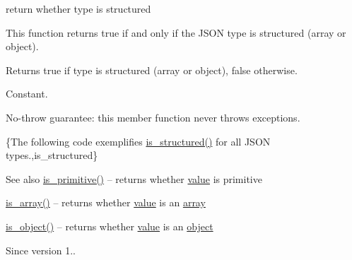 return whether type is structured 

This function returns true if and only if the J\+S\+ON type is structured (array or object).

\begin{DoxyReturn}{Returns}
{\ttfamily true} if type is structured (array or object), {\ttfamily false} otherwise.
\end{DoxyReturn}
Constant.

No-\/throw guarantee\+: this member function never throws exceptions.

\{The following code exemplifies {\ttfamily \hyperlink{classnlohmann_1_1basic__json_a9f68a0af820c3ced7f9d17851ce4c22d}{is\+\_\+structured()}} for all J\+S\+ON types.,is\+\_\+structured\}

\begin{DoxySeeAlso}{See also}
\hyperlink{classnlohmann_1_1basic__json_a6362b88718eb5c6d4fed6a61eed44b95}{is\+\_\+primitive()} -- returns whether \hyperlink{classnlohmann_1_1basic__json_a404017aa52714a0a4bc79d5af7e4ad2b}{value} is primitive 

\hyperlink{classnlohmann_1_1basic__json_aef9ce5dd2381caee1f8ddcdb5bdd9c65}{is\+\_\+array()} -- returns whether \hyperlink{classnlohmann_1_1basic__json_a404017aa52714a0a4bc79d5af7e4ad2b}{value} is an \hyperlink{classnlohmann_1_1basic__json_a8a7d537fc297bbc5b845f92fe0445e3b}{array} 

\hyperlink{classnlohmann_1_1basic__json_af8f511af124e82e4579f444b4175787c}{is\+\_\+object()} -- returns whether \hyperlink{classnlohmann_1_1basic__json_a404017aa52714a0a4bc79d5af7e4ad2b}{value} is an \hyperlink{classnlohmann_1_1basic__json_a31f84ee15c4690ff705bed74736d04c6}{object}
\end{DoxySeeAlso}
\begin{DoxySince}{Since}
version 1.. 
\end{DoxySince}
